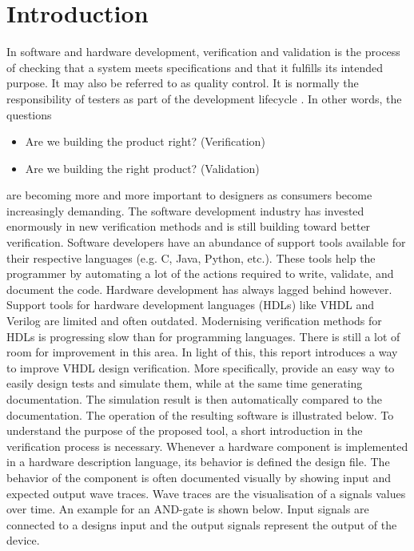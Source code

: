 \chapter{Introduction}
In software and hardware development, verification and validation is the process of checking that a system meets specifications and that it fulfills its intended purpose. It may also be referred to as quality control. It is normally the responsibility of testers as part of the development lifecycle \cite{intro:wiki}.\nline
In other words, the questions
\begin{itemize}
	\item Are we building the product right? (Verification)
	\item Are we building the right product? (Validation)
\end{itemize}
are becoming more and more important to designers as consumers become increasingly demanding.
\npar
The software development industry has invested enormously in new verification methods and is still building toward better verification. Software developers have an abundance of support tools available for their respective languages (e.g. C, Java, Python, etc.). These tools help the programmer by automating a lot of the actions required to write, validate, and document the code.
\npar
Hardware development has always lagged behind however. Support tools for hardware development languages (HDLs) like VHDL and Verilog are limited and often outdated. Modernising verification methods for HDLs is progressing slow than for programming languages. There is still a lot of room for improvement in this area.
\npar
In light of this, this report introduces a way to improve VHDL design verification. More specifically, provide an easy way to easily design tests and simulate them, while at the same time generating documentation. The simulation result is then automatically compared to the documentation. The operation of the resulting software is illustrated below.\nline
{}\nline
To understand the purpose of the proposed tool, a short introduction in the verification process is necessary.
\npar
Whenever a hardware component is implemented in a hardware description language, its behavior is defined the design file. The behavior of the component is often documented visually by showing input and expected output wave traces. Wave traces are the visualisation of a signals values over time. An example for an AND-gate is shown below. Input signals are connected to a designs input and the output signals represent the output of the device.\nline
